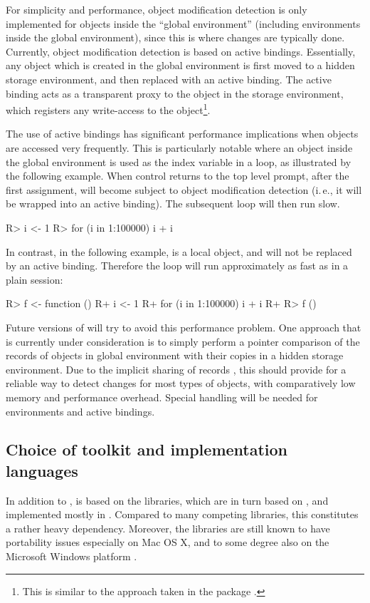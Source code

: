\documentclass[article,shortnames]{jss}
\begin{document}
For simplicity and performance, object modification detection is only
implemented for objects inside the ``global environment'' (including environments
inside the global environment), since this is where changes are typically done.
Currently, object modification detection is based on active bindings.
Essentially, any object which is created in the global environment is first
moved to a hidden storage environment, and then replaced with an active binding.
The active binding acts as a transparent proxy to the object in the storage
environment, which registers any write-access to the object\footnote{
    This is similar to the approach taken in the  package \citep{Plate2009}.
}.

The use of active bindings has significant performance implications when
objects are accessed very frequently. This is particularly notable where an
object inside the global environment is used as the index variable in a loop,
as illustrated by the following example. When control returns to the top level
prompt, after the first assignment,  will become subject to object modification
detection (i.\,e., it will be wrapped into an active
binding). The subsequent  loop will then run slow.

\begin{Code}
R> i <- 1
R> for (i in 1:100000) i + i
\end{Code}

In contrast, in the following example,  is a local object, and will not
be replaced by an active binding. Therefore the loop will run approximately as fast
as in a plain  session:

\begin{Code}
R> f <- function () {
R+    i <- 1
R+    for (i in 1:100000) i + i
R+ }
R> f ()
\end{Code}

Future versions of  will try to avoid this performance problem. 
One approach that is currently under consideration is to simply perform
a pointer comparison of the  records of objects in global environment with
their copies in a hidden storage environment. Due to the implicit sharing of
 records \citep{RDCT2010a, RDCT2010b}, this should provide for a reliable
way to detect changes for most types of  objects, with comparatively low memory
and performance overhead. Special handling will be needed for environments and
active bindings.

\subsection{Choice of toolkit and implementation languages}
\label{sec:technical_toolkit}
In addition to ,  is based on the  libraries, which are in turn based
on  \citep{perens1999}, and implemented mostly in . Compared to many competing libraries,
this constitutes a rather heavy dependency. Moreover, the  libraries are
still known to have portability issues especially on Mac OS X, and to some degree
also on the Microsoft Windows platform \citep{Jarvis2010}.
\end{document}
